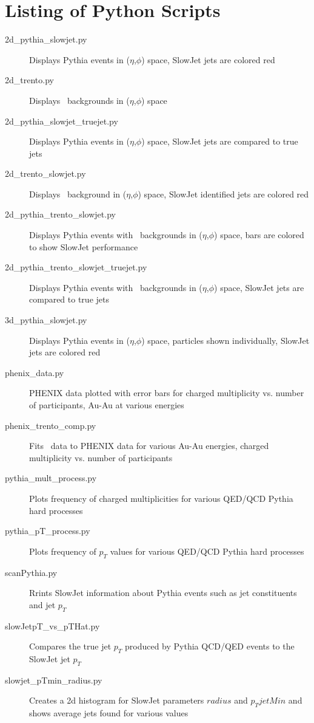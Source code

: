 \documentclass[11pt]{article}
\begin{document}
\appendix

\section{Listing of Python Scripts}
\begin{description}
\item[2d\_pythia\_slowjet.py] Displays Pythia events in ($\eta$,$\phi$) space, SlowJet jets are colored red
\item[2d\_trento.py] Displays \trento\ backgrounds in ($\eta$,$\phi$) space
\item[2d\_pythia\_slowjet\_truejet.py] Displays Pythia events in ($\eta$,$\phi$) space, SlowJet jets are compared to true jets
\item[2d\_trento\_slowjet.py] Displays \trento\ background in ($\eta$,$\phi$) space, SlowJet identified jets are colored red
\item[2d\_pythia\_trento\_slowjet.py] Displays Pythia events with \trento\ backgrounds in ($\eta$,$\phi$) space, bars are colored to show SlowJet performance
\item[2d\_pythia\_trento\_slowjet\_truejet.py] Displays Pythia events with \trento\ backgrounds in ($\eta$,$\phi$) space, SlowJet jets are compared to true jets
\item[3d\_pythia\_slowjet.py] Displays Pythia events in ($\eta$,$\phi$) space, particles shown individually, SlowJet jets are colored red
%
\item[phenix\_data.py] PHENIX data plotted with error bars for charged multiplicity vs. number of participants, Au-Au at various energies
\item[phenix\_trento\_comp.py] Fits \trento\ data to PHENIX data for various Au-Au energies, charged multiplicity vs. number of participants
%
\item[pythia\_mult\_process.py] Plots frequency of charged multiplicities for various QED/QCD Pythia hard processes
\item[pythia\_pT\_process.py] Plots frequency of $p_T$ values for various QED/QCD Pythia hard processes
%
\item[scanPythia.py] Rrints SlowJet information about Pythia events such as jet constituents and jet $p_T$
\item[slowJetpT\_vs\_pTHat.py] Compares the true jet $p_T$ produced by Pythia QCD/QED events to the SlowJet jet $p_T$ 
\item[slowjet\_pTmin\_radius.py] Creates a 2d histogram for SlowJet parameters $radius$ and $p_TjetMin$ and shows average jets found for various values

\end{description}
\end{document}
